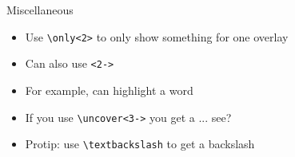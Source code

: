 %
%	
%		
%


% 	
% 	



\begin{frame}[c]{Miscellaneous}
	\begin{itemize}
		\item Use \texttt{\textbackslash only<2>} to only show something for one overlay
		\item Can also use \texttt{<2->}
		\item For example, can  highlight a word
		\item If you use \texttt{\textbackslash uncover<3->} you get a  ... see?
		\item Protip: use \texttt{\textbackslash textbackslash} to get a backslash
	\end{itemize}
\end{frame}



